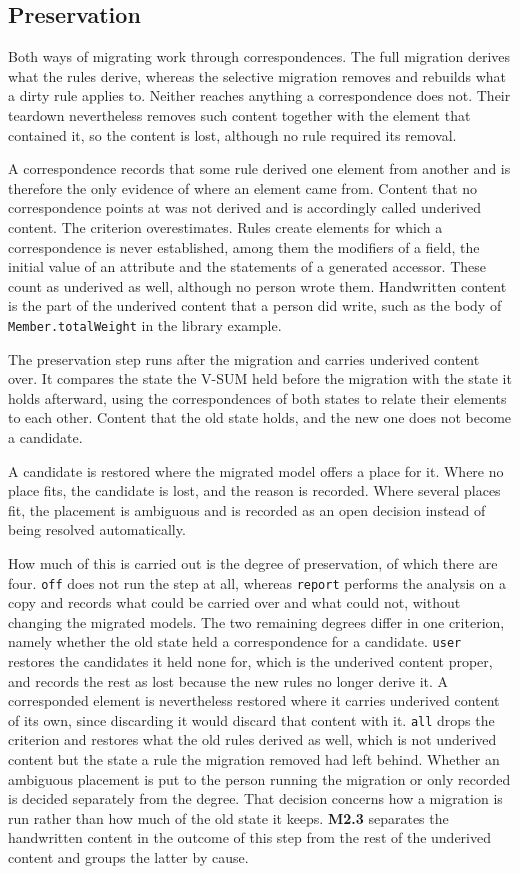 \subsection{Preservation}
\label{sec:Concept:Migration:Preservation}

Both ways of migrating work through correspondences.
The full migration derives what the rules derive, whereas the selective migration removes and rebuilds what a dirty rule applies to.
Neither reaches anything a correspondence does not.
Their teardown nevertheless removes such content together with the element that contained it, so the content is lost, although no rule required its removal.

A correspondence records that some rule derived one element from another and is therefore the only evidence of where an element came from.
Content that no correspondence points at was not derived and is accordingly called underived content.
The criterion overestimates.
Rules create elements for which a correspondence is never established, among them the modifiers of a field, the initial value of an attribute and the statements of a generated accessor.
These count as underived as well, although no person wrote them.
Handwritten content is the part of the underived content that a person did write, such as the body of \texttt{Member.totalWeight} in the library example.

The preservation step runs after the migration and carries underived content over.
It compares the state the V-SUM held before the migration with the state it holds afterward, using the correspondences of both states to relate their elements to each other.
Content that the old state holds, and the new one does not become a candidate.

A candidate is restored where the migrated model offers a place for it.
Where no place fits, the candidate is lost, and the reason is recorded.
Where several places fit, the placement is ambiguous and is recorded as an open decision instead of being resolved automatically.

How much of this is carried out is the degree of preservation, of which there are four.
\texttt{off} does not run the step at all, whereas \texttt{report} performs the analysis on a copy and records what could be carried over and what could not, without changing the migrated models.
The two remaining degrees differ in one criterion, namely whether the old state held a correspondence for a candidate.
\texttt{user} restores the candidates it held none for, which is the underived content proper, and records the rest as lost because the new rules no longer derive it.
A corresponded element is nevertheless restored where it carries underived content of its own, since discarding it would discard that content with it.
\texttt{all} drops the criterion and restores what the old rules derived as well, which is not underived content but the state a rule the migration removed had left behind.
Whether an ambiguous placement is put to the person running the migration or only recorded is decided separately from the degree.
That decision concerns how a migration is run rather than how much of the old state it keeps.
\textbf{M2.3} separates the handwritten content in the outcome of this step from the rest of the underived content and groups the latter by cause.
